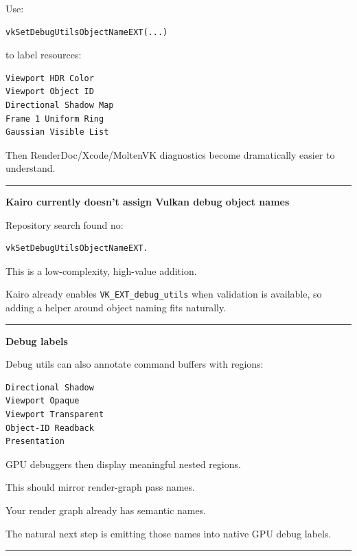 Use:

\begin{verbatim}
vkSetDebugUtilsObjectNameEXT(...)
\end{verbatim}

to label resources:

\begin{verbatim}
Viewport HDR Color
Viewport Object ID
Directional Shadow Map
Frame 1 Uniform Ring
Gaussian Visible List
\end{verbatim}

Then RenderDoc/Xcode/MoltenVK diagnostics become dramatically easier to understand.

\begin{center}\rule{0.5\linewidth}{0.5pt}\end{center}

\textbf{Kairo currently doesn't assign Vulkan debug object names}

Repository search found no:

\begin{verbatim}
vkSetDebugUtilsObjectNameEXT.
\end{verbatim}

This is a low-complexity, high-value addition.

Kairo already enables \texttt{VK\_EXT\_debug\_utils} when validation is available, so adding a helper around object naming fits naturally.

\begin{center}\rule{0.5\linewidth}{0.5pt}\end{center}

\textbf{Debug labels}

Debug utils can also annotate command buffers with regions:

\begin{verbatim}
Directional Shadow
Viewport Opaque
Viewport Transparent
Object-ID Readback
Presentation
\end{verbatim}

GPU debuggers then display meaningful nested regions.

This should mirror render-graph pass names.

Your render graph already has semantic names.

The natural next step is emitting those names into native GPU debug labels.

\begin{center}\rule{0.5\linewidth}{0.5pt}\end{center}

